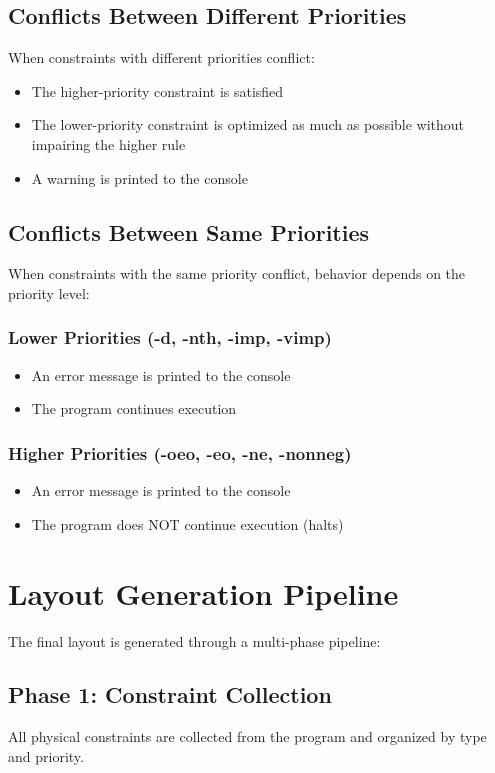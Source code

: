 \subsection{Conflicts Between Different Priorities}
When constraints with different priorities conflict:
\begin{itemize}
\item The higher-priority constraint is satisfied
\item The lower-priority constraint is optimized as much as possible without impairing the higher rule
\item A warning is printed to the console
\end{itemize}

\subsection{Conflicts Between Same Priorities}
When constraints with the same priority conflict, behavior depends on the priority level:

\subsubsection{Lower Priorities (-d, -nth, -imp, -vimp)}
\begin{itemize}
\item An error message is printed to the console
\item The program continues execution
\end{itemize}

\subsubsection{Higher Priorities (-oeo, -eo, -ne, -nonneg)}
\begin{itemize}
\item An error message is printed to the console
\item The program does NOT continue execution (halts)
\end{itemize}

\section{Layout Generation Pipeline}
The final layout is generated through a multi-phase pipeline:

\subsection{Phase 1: Constraint Collection}
All physical constraints are collected from the program and organized by type and priority.


